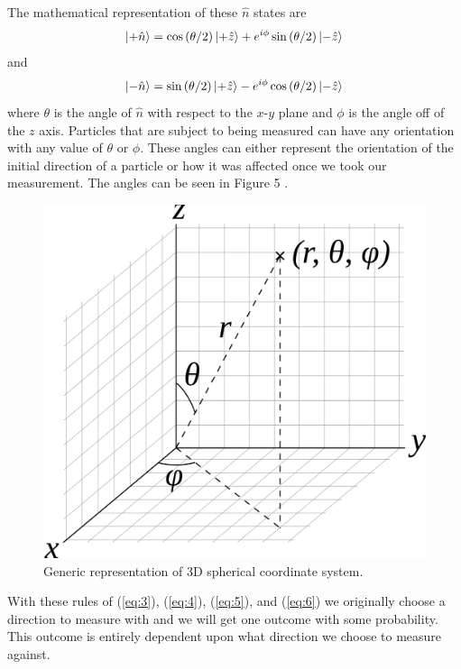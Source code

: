 \documentclass[twocolumn]{article}
\begin{document}
The mathematical representation of these $\hat{n}$ states are 
\begin{equation} \label{eq:5}
\ket{+\hat{n}}=\cos{(\theta/2)}\ket{+\hat{z}}+e^{i\phi}\sin{(\theta/2)}\ket{-\hat{z}}
\end{equation}
and
\begin{equation} \label{eq:6}
\ket{-\hat{n}}=\sin{(\theta/2)}\ket{+\hat{z}}-e^{i\phi}\cos{(\theta/2)}\ket{-\hat{z}}
\end{equation}
where $\theta$ is the angle of $\hat{n}$ with respect to the $x$-$y$ plane and $\phi$ is the angle off of the $z$ axis. Particles that are subject to being measured can have any orientation with any value of $\theta$ or $\phi$. These angles can either represent the orientation of the initial direction of a particle or how it was affected once we took our measurement. The angles can be seen in Figure 5 \cite{Hazewinkel}.
\begin{figure}[htbp]
\begin{center}
\includegraphics[width=0.75\linewidth]{Spherical-Coordinate-System.png}
\caption{Generic representation of 3D spherical coordinate system.}
\end{center}
\end{figure}
\newpage
With these rules of (\ref{eq:3}), (\ref{eq:4}), (\ref{eq:5}), and (\ref{eq:6}) we originally choose a direction to measure with and we will get one outcome with some probability. This outcome is entirely dependent upon what direction we choose to measure against.
\end{document}

